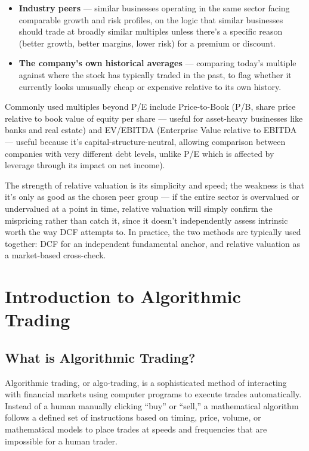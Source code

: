\documentclass[12pt,openany]{book}
\begin{document}
\begin{itemize}[leftmargin=*]
    \item \textbf{Industry peers} --- similar businesses operating in the same sector facing comparable growth and risk profiles, on the logic that similar businesses should trade at broadly similar multiples unless there's a specific reason (better growth, better margins, lower risk) for a premium or discount.
    \item \textbf{The company's own historical averages} --- comparing today's multiple against where the stock has typically traded in the past, to flag whether it currently looks unusually cheap or expensive relative to its own history.
\end{itemize}

Commonly used multiples beyond P/E include Price-to-Book (P/B, share price relative to book value of equity per share --- useful for asset-heavy businesses like banks and real estate) and EV/EBITDA (Enterprise Value relative to EBITDA --- useful because it's capital-structure-neutral, allowing comparison between companies with very different debt levels, unlike P/E which is affected by leverage through its impact on net income).

The strength of relative valuation is its simplicity and speed; the weakness is that it's only as good as the chosen peer group --- if the entire sector is overvalued or undervalued at a point in time, relative valuation will simply confirm the mispricing rather than catch it, since it doesn't independently assess intrinsic worth the way DCF attempts to. In practice, the two methods are typically used together: DCF for an independent fundamental anchor, and relative valuation as a market-based cross-check.

\chapter{Introduction to Algorithmic Trading}


\section{What is Algorithmic Trading?}

Algorithmic trading, or algo-trading, is a sophisticated method of interacting with financial markets using computer programs to execute trades automatically. Instead of a human manually clicking ``buy'' or ``sell,'' a mathematical algorithm follows a defined set of instructions based on timing, price, volume, or mathematical models to place trades at speeds and frequencies that are impossible for a human trader.
\end{document}
